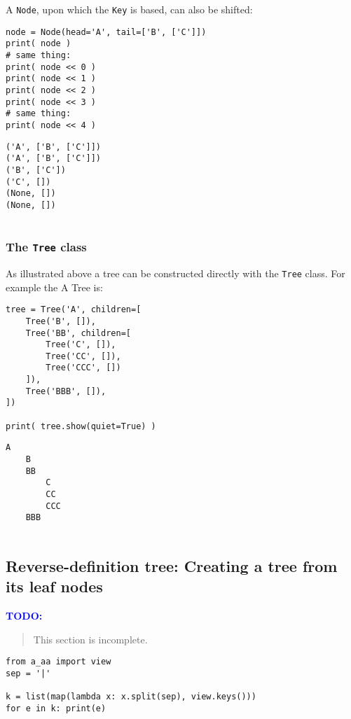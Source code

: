 \documentclass[10pt]{amsart}
\numberwithin{equation}{section}
\begin{document}
A \texttt{Node}, upon which the \texttt{Key} is based, can also be shifted:
\begin{verbatim}
node = Node(head='A', tail=['B', ['C']])
print( node )
# same thing:
print( node << 0 )
print( node << 1 )
print( node << 2 )
print( node << 3 )
# same thing:
print( node << 4 )
\end{verbatim}

\begin{verbatim}
('A', ['B', ['C']])
('A', ['B', ['C']])
('B', ['C'])
('C', [])
(None, [])
(None, [])


\end{verbatim}

\subsubsection{The \texttt{Tree} class}
\label{sec:org330a9ec}
As illustrated above a tree can be constructed directly with the \texttt{Tree} class.
For example the A Tree is:
\begin{verbatim}
tree = Tree('A', children=[
    Tree('B', []),
    Tree('BB', children=[
        Tree('C', []),
        Tree('CC', []),
        Tree('CCC', [])
    ]),
    Tree('BBB', []),
])

print( tree.show(quiet=True) )
\end{verbatim}

\begin{verbatim}
A
    B
    BB
        C
        CC
        CCC
    BBB


\end{verbatim}


\subsection{Reverse-definition tree: Creating a tree from its leaf nodes}
\label{sec:org5629dd5}

\mbox{}

\textcolor{blue}{\bf TODO:}
\begin{quote}
This section is incomplete. 
\end{quote}

\begin{verbatim}
from a_aa import view
sep = '|'

k = list(map(lambda x: x.split(sep), view.keys())) 
for e in k: print(e)
\end{verbatim}
\end{document}

